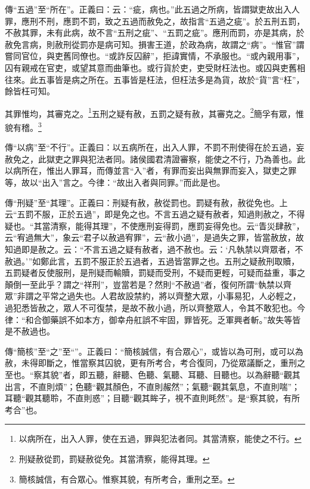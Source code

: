 {\noindent\zhuan{}\fzbyks 傳“五過”至“所在”。正義曰：云：“疵，病也。”此五過之所病，皆謂獄吏故出入人罪，應刑不刑，應罰不罰，致之五過而赦免之，故指言“五過之疵”。於五刑五罰，不赦其罪，未有此病，故不言“五刑之疵”、“五罰之疵”。應刑而罰，亦是其病，於赦免言病，則赦刑從罰亦是病可知。損害王道，於政為病，故謂之“病”。“惟官”謂嘗同官位，與吏舊同僚也。“或詐反囚辭”，拒諱實情，不承服也。“或內親用事”，囚有親戒在官吏，或望其意而曲筆也。或行貨於吏，吏受財枉法也。或囚與吏舊相往來。此五事皆是病之所在。五事皆是枉法，但枉法多是為貨，故於“貨”言“枉”，餘皆枉可知。 \par}

其罪惟均，其審克之。\footnote{以病所在，出入人罪，使在五過，罪與犯法者同。其當清察，能使之不行。}五刑之疑有赦，五罰之疑有赦，其審克之。\footnote{刑疑赦從罰，罰疑赦從免。其當清察，能得其理。}簡孚有眾，惟貌有稽。\footnote{簡核誠信，有合眾心。惟察其貌，有所考合，重刑之至。}


{\noindent\zhuan{}\fzbyks 傳“以病”至“不行”。正義曰：以五病所在，出入人罪，不罰不刑使得在於五過，妄赦免之，此獄吏之罪與犯法者同。諸侯國君清證審察，能使之不行，乃為善也。此以病所在，惟出人罪耳，而傳並言“入”者，有罪而妄出與無罪而妄入，獄吏之罪等，故以“出入”言之。今律：“故出入者與同罪。”而此是也。 \par}

{\noindent\zhuan{}\fzbyks 傳“刑疑”至“其理”。正義曰：刑疑有赦，赦從罰也。罰疑有赦，赦從免也。上云“五罰不服，正於五過”，即是免之也。不言五過之疑有赦者，知過則赦之，不得疑也。“其當清察，能得其理”，不使應刑妄得罰，應罰妄得免也。云“眚災肆赦”，云“宥過無大”，象云“君子以赦過宥罪”，云“赦小過”，是過失之罪，皆當赦放，故知過即是赦之。云：“不言五過之疑有赦者，過不赦也。云：‘凡執禁以齊眾者，不赦過。’”如鄭此言，五罰不服正於五過者，五過皆當罪之也。五刑之疑赦刑取贖，五罰疑者反使服刑，是刑疑而輸贖，罰疑而受刑，不疑而更輕，可疑而益重，事之顛倒一至此乎？謂之“祥刑”，豈當若是？然則“不赦過”者，復何所謂“執禁以齊眾”非謂之平常之過失也。人君故設禁約，將以齊整大眾，小事易犯，人必輕之，過犯悉皆赦之，眾人不可復禁，是故不赦小過，所以齊整眾人，令其不敢犯也。今律：“和合御藥誤不如本方，御幸舟舡誤不牢固，罪皆死。乏軍興者斬。”故失等皆是不赦過也。 \par}

{\noindent\zhuan{}\fzbyks 傳“簡核”至“之”至“”。正義曰：“簡核誠信，有合眾心”，或皆以為可刑，或可以為赦，未得即斷之，惟當察其囚貌，更有所考合，考合復同，乃從眾議斷之，重刑之至也。“察其貌”者，即五聽，辭聽、色聽、氣聽、耳聽、目聽也。以為辭聽“觀其出言，不直則煩”；色聽“觀其顏色，不直則赧然”；氣聽“觀其氣息，不直則喘”；耳聽“觀其聽聆，不直則惑”；目聽“觀其眸子，視不直則眊然”。是“察其貌，有所考合”也。 \par}

